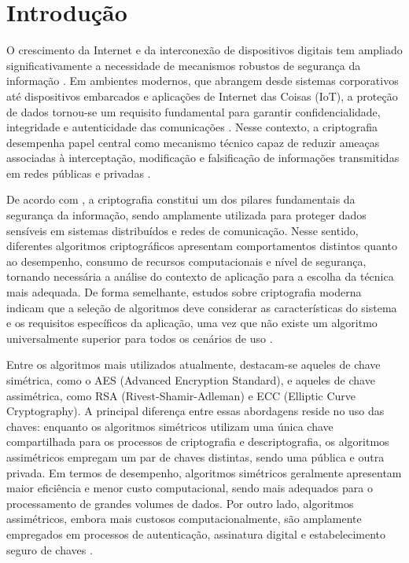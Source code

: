 \chapter{Introdução} \label{cap:Introducao}

O crescimento da Internet e da interconexão de dispositivos digitais tem ampliado significativamente a necessidade de mecanismos robustos de segurança da informação \cite{paula2020segurancca}. Em ambientes modernos, que abrangem desde sistemas corporativos até dispositivos embarcados e aplicações de Internet das Coisas (IoT), a proteção de dados tornou-se um requisito fundamental para garantir confidencialidade, integridade e autenticidade das comunicações \cite{adil2021hash}. Nesse contexto, a criptografia desempenha papel central como mecanismo técnico capaz de reduzir ameaças associadas à interceptação, modificação e falsificação de informações transmitidas em redes públicas e privadas \cite{limniotis2021cryptography}.

De acordo com \cite{correia2025criptografia}, a criptografia constitui um dos pilares fundamentais da segurança da informação, sendo amplamente utilizada para proteger dados sensíveis em sistemas distribuídos e redes de comunicação. Nesse sentido, diferentes algoritmos criptográficos apresentam comportamentos distintos quanto ao desempenho, consumo de recursos computacionais e nível de segurança, tornando necessária a análise do contexto de aplicação para a escolha da técnica mais adequada. De forma semelhante, estudos sobre criptografia moderna indicam que a seleção de algoritmos deve considerar as características do sistema e os requisitos específicos da aplicação, uma vez que não existe um algoritmo universalmente superior para todos os cenários de uso \cite{ludwig2020estado}. 

Entre os algoritmos mais utilizados atualmente, destacam-se aqueles de chave simétrica, como o AES (Advanced Encryption Standard), e aqueles de chave assimétrica, como RSA (Rivest-Shamir-Adleman) e ECC (Elliptic Curve Cryptography). A principal diferença entre essas abordagens reside no uso das chaves: enquanto os algoritmos simétricos utilizam uma única chave compartilhada para os processos de criptografia e descriptografia, os algoritmos assimétricos empregam um par de chaves distintas, sendo uma pública e outra privada. Em termos de desempenho, algoritmos simétricos geralmente apresentam maior eficiência e menor custo computacional, sendo mais adequados para o processamento de grandes volumes de dados. Por outro lado, algoritmos assimétricos, embora mais custosos computacionalmente, são amplamente empregados em processos de autenticação, assinatura digital e estabelecimento seguro de chaves \cite{shaikh2024comparative}. 

